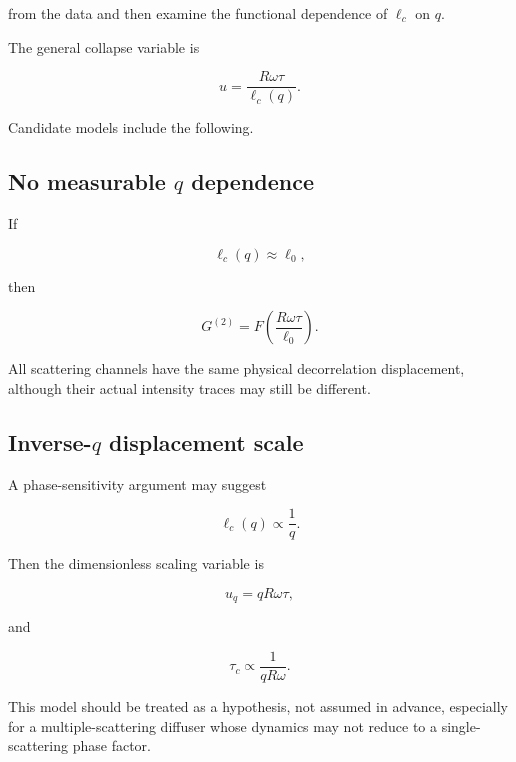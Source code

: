 \documentclass[11pt,letterpaper]{article}
\newcommand{\Gnorm}{G^{(2)}}
\begin{document}
from the data and then examine the functional dependence of $\ell_c$ on $q$.

The general collapse variable is

\begin{equation}
    \boxed{
    u=
    \frac{R\omega\tau}{\ell_c(q)}.
    }
    \label{eq:master_variable}
\end{equation}

Candidate models include the following.

\subsection{No measurable \texorpdfstring{$q$}{q} dependence}

If

\begin{equation}
    \ell_c(q)\approx \ell_0,
\end{equation}

then

\begin{equation}
    \Gnorm
    =
    F\left(
    \frac{R\omega\tau}{\ell_0}
    \right).
\end{equation}

All scattering channels have the same physical decorrelation displacement,
although their actual intensity traces may still be different.

\subsection{Inverse-\texorpdfstring{$q$}{q} displacement scale}

A phase-sensitivity argument may suggest

\begin{equation}
    \ell_c(q)\propto \frac{1}{q}.
\end{equation}

Then the dimensionless scaling variable is

\begin{equation}
    u_q=qR\omega\tau,
    \label{eq:q_scaling}
\end{equation}

and

\begin{equation}
    \tau_c\propto \frac{1}{qR\omega}.
\end{equation}

This model should be treated as a hypothesis, not assumed in advance,
especially for a multiple-scattering diffuser whose dynamics may not reduce
to a single-scattering phase factor.
\end{document}
